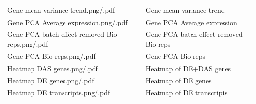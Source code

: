 \documentclass[]{article}
\begin{document}
\begin{longtable}[]{@{}ll@{}}
\begin{minipage}[t]{0.51\columnwidth}
Gene mean-variance trend.png/.pdf\strut
\end{minipage} & \begin{minipage}[t]{0.43\columnwidth}\raggedright\strut
Gene mean-variance trend\strut
\end{minipage}\tabularnewline
\begin{minipage}[t]{0.51\columnwidth}\raggedright\strut
Gene PCA Average expression.png/.pdf\strut
\end{minipage} & \begin{minipage}[t]{0.43\columnwidth}\raggedright\strut
Gene PCA Average expression\strut
\end{minipage}\tabularnewline
\begin{minipage}[t]{0.51\columnwidth}\raggedright\strut
Gene PCA batch effect removed Bio-reps.png/.pdf\strut
\end{minipage} & \begin{minipage}[t]{0.43\columnwidth}\raggedright\strut
Gene PCA batch effect removed Bio-reps\strut
\end{minipage}\tabularnewline
\begin{minipage}[t]{0.51\columnwidth}\raggedright\strut
Gene PCA Bio-reps.png/.pdf\strut
\end{minipage} & \begin{minipage}[t]{0.43\columnwidth}\raggedright\strut
Gene PCA Bio-reps\strut
\end{minipage}\tabularnewline
\begin{minipage}[t]{0.51\columnwidth}\raggedright\strut
Heatmap DAS genes.png/.pdf\strut
\end{minipage} & \begin{minipage}[t]{0.43\columnwidth}\raggedright\strut
Heatmap of DE+DAS genes\strut
\end{minipage}\tabularnewline
\begin{minipage}[t]{0.51\columnwidth}\raggedright\strut
Heatmap DE genes.png/.pdf\strut
\end{minipage} & \begin{minipage}[t]{0.43\columnwidth}\raggedright\strut
Heatmap of DE genes\strut
\end{minipage}\tabularnewline
\begin{minipage}[t]{0.51\columnwidth}\raggedright\strut
Heatmap DE transcripts.png/.pdf\strut
\end{minipage} & \begin{minipage}[t]{0.43\columnwidth}\raggedright\strut
Heatmap of DE transcripts\strut
\end{minipage}\tabularnewline

\end{longtable}
\end{document}
